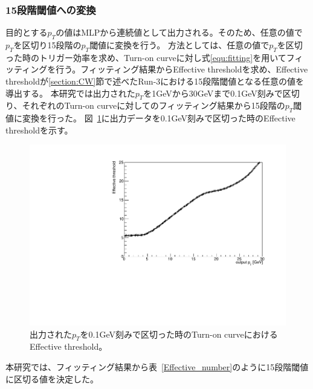 \subsubsection{15段階閾値への変換}
目的とする$p_T$の値はMLPから連続値として出力される。そのため、任意の値で$p_T$を区切り15段階の$p_T$閾値に変換を行う。
方法としては、任意の値で$p_T$を区切った時のトリガー効率を求め、Turn-on curveに対し式\eqref{equ:fitting}を用いてフィッティングを行う。フィッティング結果からEffective thresholdを求め、Effective thresholdが\ref{section:CW}節で述べたRun-3における15段階閾値となる任意の値を導出する。
本研究では出力された$p_T$を1GeVから30GeVまで0.1GeV刻みで区切り、それぞれのTurn-on curveに対してのフィッティング結果から15段階の$p_T$閾値に変換を行った。
図~\ref{fig:Effictive_thr_v1}に出力データを0.1GeV刻みで区切った時のEffective thresholdを示す。
\begin{figure}[tb]
  \centering
  \includegraphics[clip, width=12cm]{fig/4/Effictive_thr_v1.pdf}
  \caption{出力された$p_T$を0.1GeV刻みで区切った時のTurn-on curveにおけるEffective threshold。}
  \label{fig:Effictive_thr_v1}
\end{figure}
本研究では、フィッティング結果から表~\ref{Effective_number}のように15段階閾値に区切る値を決定した。

